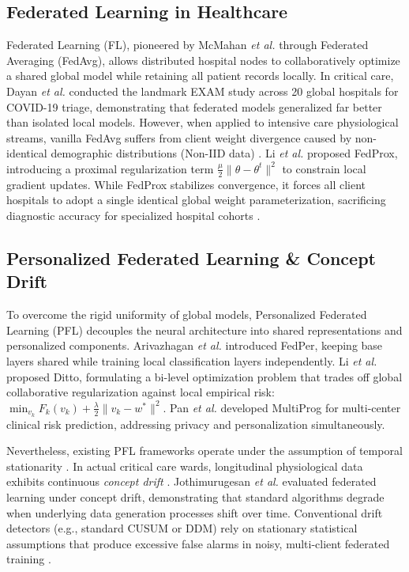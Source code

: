 \documentclass[journal,twocolumn,10pt]{IEEEtran}
\begin{document}
\subsection{Federated Learning in Healthcare}
Federated Learning (FL), pioneered by McMahan \textit{et al.} \cite{mcmahan2017} through Federated Averaging (FedAvg), allows distributed hospital nodes to collaboratively optimize a shared global model while retaining all patient records locally. In critical care, Dayan \textit{et al.} \cite{dayan2021exam} conducted the landmark EXAM study across 20 global hospitals for COVID-19 triage, demonstrating that federated models generalized far better than isolated local models. However, when applied to intensive care physiological streams, vanilla FedAvg suffers from client weight divergence caused by non-identical demographic distributions (Non-IID data) \cite{li2020fedprox,tang2025horizon}. Li \textit{et al.} \cite{li2020fedprox} proposed FedProx, introducing a proximal regularization term $\frac{\mu}{2} \|\theta - \theta^t\|^2$ to constrain local gradient updates. While FedProx stabilizes convergence, it forces all client hospitals to adopt a single identical global weight parameterization, sacrificing diagnostic accuracy for specialized hospital cohorts \cite{arivazhagan2020,wang2025personalized}.

\subsection{Personalized Federated Learning \& Concept Drift}
To overcome the rigid uniformity of global models, Personalized Federated Learning (PFL) decouples the neural architecture into shared representations and personalized components. Arivazhagan \textit{et al.} \cite{arivazhagan2020} introduced FedPer, keeping base layers shared while training local classification layers independently. Li \textit{et al.} \cite{li2021ditto} proposed Ditto, formulating a bi-level optimization problem that trades off global collaborative regularization against local empirical risk: $\min_{v_k} F_k(v_k) + \frac{\lambda}{2} \|v_k - w^*\|^2$. Pan \textit{et al.} \cite{pan2025multiprog} developed MultiProg for multi-center clinical risk prediction, addressing privacy and personalization simultaneously.

Nevertheless, existing PFL frameworks operate under the assumption of temporal stationarity \cite{wang2025personalized,yuan2024trend}. In actual critical care wards, longitudinal physiological data exhibits continuous \textit{concept drift} \cite{jothimurugesan2022,bernardi2023adaptive}. Jothimurugesan \textit{et al.} \cite{jothimurugesan2022} evaluated federated learning under concept drift, demonstrating that standard algorithms degrade when underlying data generation processes shift over time. Conventional drift detectors (e.g., standard CUSUM or DDM) rely on stationary statistical assumptions that produce excessive false alarms in noisy, multi-client federated training \cite{bernardi2023adaptive}.
\end{document}
